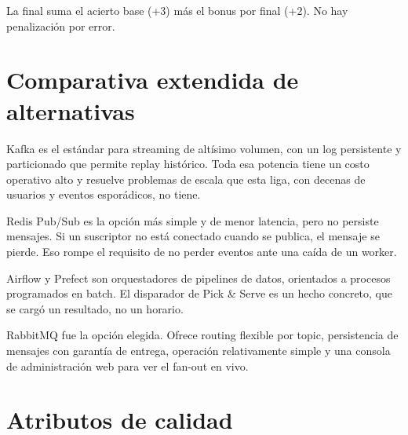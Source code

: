 \vspace{2pt}
{\small La final suma el acierto base (+3) más el bonus por final (+2). No hay penalización por error.}

\section{Comparativa extendida de alternativas}
\label{anx:comp}

Kafka es el estándar para streaming de altísimo volumen, con un log persistente y particionado que permite replay histórico. Toda esa potencia tiene un costo operativo alto y resuelve problemas de escala que esta liga, con decenas de usuarios y eventos esporádicos, no tiene.

Redis Pub/Sub es la opción más simple y de menor latencia, pero no persiste mensajes. Si un suscriptor no está conectado cuando se publica, el mensaje se pierde. Eso rompe el requisito de no perder eventos ante una caída de un worker.

Airflow y Prefect son orquestadores de pipelines de datos, orientados a procesos programados en batch. El disparador de Pick \& Serve es un hecho concreto, que se cargó un resultado, no un horario.

RabbitMQ fue la opción elegida. Ofrece routing flexible por topic, persistencia de mensajes con garantía de entrega, operación relativamente simple y una consola de administración web para ver el fan-out en vivo.

\section{Atributos de calidad}
\label{anx:calidad}

